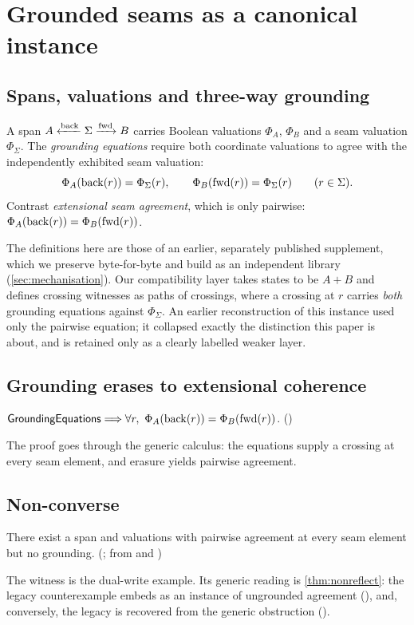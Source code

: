 \section{Grounded seams as a canonical instance}\label{sec:seams}

\subsection{Spans, valuations and three-way grounding}
A span $A \xleftarrow{\mathrm{back}} \Sigma \xrightarrow{\mathrm{fwd}} B$ carries Boolean valuations $\Phi_A$, $\Phi_B$ and a seam valuation $\Phi_\Sigma$. The \emph{grounding equations} require both coordinate valuations to agree with the independently exhibited seam valuation:
\[
\Phi_A(\mathrm{back}(r)) = \Phi_\Sigma(r), \qquad \Phi_B(\mathrm{fwd}(r)) = \Phi_\Sigma(r) \qquad (r \in \Sigma).
\]
Contrast \emph{extensional seam agreement}, which is only pairwise: $\Phi_A(\mathrm{back}(r)) = \Phi_B(\mathrm{fwd}(r))$.

The definitions here are those of an earlier, separately published supplement, which we preserve byte-for-byte and build as an independent library (\cref{sec:mechanisation}). Our compatibility layer takes states to be $A + B$ and defines crossing witnesses as paths of crossings, where a crossing at $r$ carries \emph{both} grounding equations against $\Phi_\Sigma$. An earlier reconstruction of this instance used only the pairwise equation; it collapsed exactly the distinction this paper is about, and is retained only as a clearly labelled weaker layer.

\subsection{Grounding erases to extensional coherence}
\begin{theorem}\label{thm:ground-erases}
$\mathsf{GroundingEquations} \Longrightarrow \forall r,\ \Phi_A(\mathrm{back}(r)) = \Phi_B(\mathrm{fwd}(r))$. ()
\end{theorem}
The proof goes through the generic calculus: the equations supply a crossing at every seam element, and erasure yields pairwise agreement.

\subsection{Non-converse}
\begin{theorem}\label{thm:pairwise}
There exist a span and valuations with pairwise agreement at every seam element but no grounding. (; from  and )
\end{theorem}
The witness is the dual-write example. Its generic reading is \cref{thm:nonreflect}: the legacy counterexample embeds as an instance of ungrounded agreement (), and, conversely, the legacy  is recovered from the generic obstruction ().

